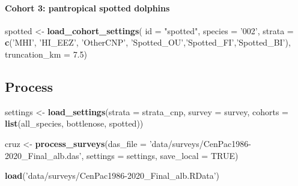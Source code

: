 \documentclass[
]{book}
\newenvironment{Shaded}{\begin{snugshade}}{\end{snugshade}}
\newcommand{\DataTypeTok}[1]{\textcolor[rgb]{0.13,0.29,0.53}{#1}}
\newcommand{\FloatTok}[1]{\textcolor[rgb]{0.00,0.00,0.81}{#1}}
\newcommand{\KeywordTok}[1]{\textcolor[rgb]{0.13,0.29,0.53}{\textbf{#1}}}
\newcommand{\NormalTok}[1]{#1}
\newcommand{\OtherTok}[1]{\textcolor[rgb]{0.56,0.35,0.01}{#1}}
\newcommand{\StringTok}[1]{\textcolor[rgb]{0.31,0.60,0.02}{#1}}
\begin{document}
\hypertarget{cohort-3-pantropical-spotted-dolphins-1}{%
\paragraph{Cohort 3: pantropical spotted dolphins}\label{cohort-3-pantropical-spotted-dolphins-1}}

\begin{Shaded}
\begin{Highlighting}[]
\NormalTok{spotted <-}\StringTok{ }\KeywordTok{load_cohort_settings}\NormalTok{(}
  \DataTypeTok{id =} \StringTok{"spotted"}\NormalTok{,}
  \DataTypeTok{species =} \StringTok{'002'}\NormalTok{,}
  \DataTypeTok{strata =} \KeywordTok{c}\NormalTok{(}\StringTok{'MHI'}\NormalTok{, }\StringTok{'HI_EEZ'}\NormalTok{, }\StringTok{'OtherCNP'}\NormalTok{,}
             \StringTok{'Spotted_OU'}\NormalTok{,}\StringTok{'Spotted_FI'}\NormalTok{,}\StringTok{'Spotted_BI'}\NormalTok{),}
  \DataTypeTok{truncation_km =} \FloatTok{7.5}\NormalTok{)}
\end{Highlighting}
\end{Shaded}

\hypertarget{process-1}{%
\subsection*{Process}\label{process-1}}

\begin{Shaded}
\begin{Highlighting}[]
\NormalTok{settings <-}\StringTok{ }\KeywordTok{load_settings}\NormalTok{(}\DataTypeTok{strata =}\NormalTok{ strata_cnp,}
                          \DataTypeTok{survey =}\NormalTok{ survey,}
                          \DataTypeTok{cohorts =} \KeywordTok{list}\NormalTok{(all_species,}
\NormalTok{                                         bottlenose,}
\NormalTok{                                         spotted))}

\NormalTok{cruz <-}\StringTok{ }
\StringTok{  }\KeywordTok{process_surveys}\NormalTok{(}\DataTypeTok{das_file =} \StringTok{'data/surveys/CenPac1986-2020_Final_alb.das'}\NormalTok{,}
                  \DataTypeTok{settings =}\NormalTok{ settings,}
                  \DataTypeTok{save_local =} \OtherTok{TRUE}\NormalTok{) }
\end{Highlighting}
\end{Shaded}

\begin{Shaded}
\begin{Highlighting}[]
\KeywordTok{load}\NormalTok{(}\StringTok{'data/surveys/CenPac1986-2020_Final_alb.RData'}\NormalTok{)}
\end{Highlighting}
\end{Shaded}
\end{document}

